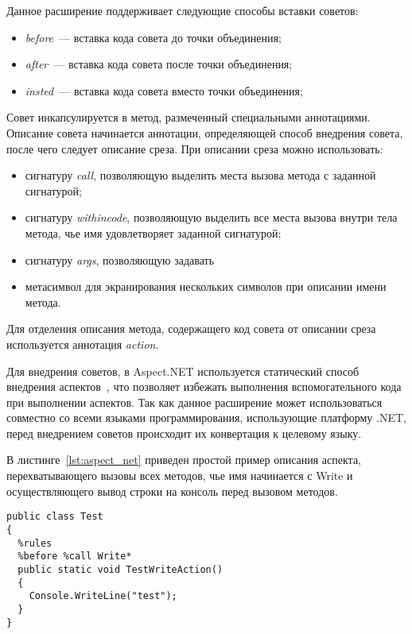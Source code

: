 Данное расширение поддерживает следующие способы вставки советов:
\begin{itemize}
  \item \textit{before}~--- вставка кода совета до точки объединения;
  \item \textit{after}~--- вставка кода совета после точки объединения;
  \item \textit{insted}~--- вставка кода совета вместо точки объединения;
\end{itemize}
Совет инкапсулируется в метод, размеченный специальными аннотациями.
Описание совета начинается аннотации, определяющей способ внедрения совета, после чего следует описание среза.
При описании среза можно использовать:
\begin{itemize}
  \item сигнатуру \textit{call}, позволяющую выделить места вызова метода с заданной сигнатурой;
  \item сигнатуру \textit{withincode}, позволяющую выделить все места вызова внутри тела метода, чье имя удовлетворяет заданной сигнатурой;
  \item сигнатуру \textit{args}, позволяющую задавать 
  \item метасимвол \quotes{*} для экранирования нескольких символов при описании имени метода.
\end{itemize}
Для отделения описания метода, содержащего код совета от описании среза используется аннотация \textit{action}.

Для внедрения советов, в Aspect.NET используется статический способ внедрения аспектов~\cite{aspect_net_toolkit_2006}, что позволяет избежать выполнения вспомогательного кода при выполнении аспектов.
Так как данное расширение может использоваться совместно со всеми языками программирования, использующие платформу .NET, перед внедрением советов происходит их конвертация к целевому языку.

В листинге~\ref{lst:aspect_net} приведен простой пример описания аспекта, 
  перехватывающего вызовы всех методов, чье имя начинается с Write и осуществляющего вывод строки  на консоль перед вызовом методов.
  \begin{lstlisting}[style={java},  label={lst:aspect_net}, caption={Пример 
  описания аспекта при помощи Aspect.NET.}]
%aspect Test
public class Test
{
  %rules
  %before %call Write*
  public static void TestWriteAction()
  {
    Console.WriteLine("test");
  }
}
  \end{lstlisting}
